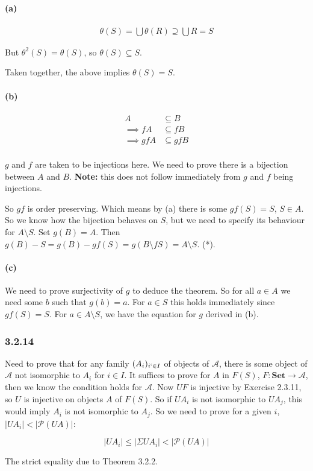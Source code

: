 \documentclass{article}
\begin{document}
\paragraph{(a)}

\begin{align*}
  \theta(S) = \bigcup \theta(R) \supseteq \bigcup R = S
\end{align*}

But $\theta^2(S) = \theta(S)$, so $\theta(S) \subseteq S$.

Taken together, the above implies $\theta(S) = S$.

\paragraph{(b)}
\begin{align*}
  A &\subseteq B \\
  \implies fA &\subseteq fB \\
  \implies gfA &\subseteq gfB \\
\end{align*}

$g$ and $f$ are taken to be injections here. We need to prove there is a bijection between $A$ and $B$. \textbf{Note:} this does not follow immediately from $g$
and $f$ being injections.

So $gf$ is order preserving. Which means by (a) there is some $gf(S) = S$, $S \in A$. So we know how the bijection behaves on $S$, but we need to specify its behaviour for $A \setminus S$. Set $g(B) = A$. Then $g(B) - S = g(B) - gf(S) = g(B \setminus fS) = A \setminus S$. (*).

\paragraph{(c)}

We need to prove surjectivity of $g$ to deduce the theorem. So for all $a \in A$ we need some $b$ such that $g(b) = a$. For $a \in S$ this holds immediately since $gf(S) = S$. For $a \in A \setminus S$, we have the equation for $g$ derived in (b).

\subsubsection*{3.2.14}

Need to prove that for any family $(A_i)_{i `\in I}$  of objects of $\mathcal{A}$, there is some object of $\mathcal{A}$ not isomorphic to $A_i$ for $i \in I$.
It suffices to prove for $A$ in $F(S)$,  $F: \mathbf{Set} \rightarrow \mathcal{A}$, then we know the condition holds for $\mathcal{A}$. Now $UF$ is injective by Exercise 2.3.11,
so $U$ is injective on objects $A$ of $F(S)$. So if $UA_i$ is not isomorphic to $UA_j$, this would imply $A_i$ is not isomorphic to $A_j$. So we need to prove for a given $i$,  $|UA_i| < |\mathcal{P}(UA)|$:

\begin{equation*}
  |UA_i| \leq |\Sigma UA_i| < |\mathcal{P}(UA)|
\end{equation*}

The strict equality due to Theorem 3.2.2.
\end{document}
